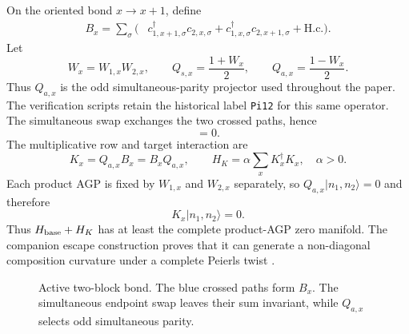 \documentclass[11pt]{article}
\theoremstyle{definition}
\theoremstyle{remark}
\newcommand{\ket}[1]{\lvert #1\rangle}
\begin{document}
On the oriented bond $x\to x+1$, define
\begin{equation}
\begin{aligned}
 B_x=\sum_\sigma(&c_{1,x+1,\sigma}^\dagger c_{2,x,\sigma}
 +c_{1,x,\sigma}^\dagger c_{2,x+1,\sigma}+\mathrm{H.c.}).
\end{aligned}
\label{eq:Bx}
\end{equation}
Let
\begin{equation}
 W_x=W_{1,x}W_{2,x},
 \qquad
 Q_{s,x}=\frac{1+W_x}{2},
 \qquad
 Q_{a,x}=\frac{1-W_x}{2}.
 \label{eq:Qsa}
\end{equation}
Thus $Q_{a,x}$ is the odd simultaneous-parity projector used throughout the paper.  The verification scripts retain the historical label \texttt{Pi12} for this same operator.
The simultaneous swap exchanges the two crossed paths, hence
\begin{equation}
 [B_x,W_x]=0.
 \label{eq:B-comm-W}
\end{equation}
The multiplicative row and target interaction are
\begin{equation}
 K_x=Q_{a,x}B_x=B_xQ_{a,x},
 \qquad
 H_K=\alpha\sum_xK_x^\dagger K_x,
 \quad \alpha>0.
 \label{eq:K-target}
\end{equation}
Each product AGP is fixed by $W_{1,x}$ and $W_{2,x}$ separately, so $Q_{a,x}\ket{n_1,n_2}=0$ and therefore
\begin{equation}
 K_x\ket{n_1,n_2}=0.
\end{equation}
Thus $H_{\rm base}+H_K$ has at least the complete product-AGP zero manifold.  The companion escape construction proves that it can generate a non-diagonal composition curvature under a complete Peierls twist \cite{SledgianowskiNoGo}.

\begin{figure}[t]
\centering
{}
\caption{Active two-block bond.  The blue crossed paths form $B_x$.  The simultaneous endpoint swap leaves their sum invariant, while $Q_{a,x}$ selects odd simultaneous parity.}
\label{fig:active-bond}
\end{figure}
\end{document}
